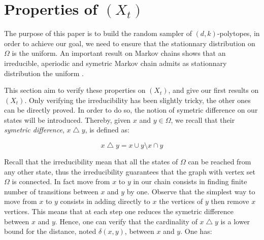 \documentclass[a4paper]{article}
\begin{document}
\section{Properties of $(X_t)$}

The purpose of this paper is to build the random sampler of $(d,k)$-polytopes, in order to achieve our goal, we need to ensure that the stationnary distribution on $\Omega$ is the uniform. An important result on Markov chains shows that an irreducible, aperiodic and symetric Markov chain admits as stationnary distribution the uniform \cite{levin2009markov}.

This section aim to verify these properties on $(X_t)$, and give our first results on $(X_t)$. Only verifying the irreducibility has been slightly tricky, the other ones can be directly proved. In order to do so, the notion of symetric difference on our states will be introduced. Thereby, given $x$ and $y \in \Omega$, we recall that their \textit{symetric difference}, $x \bigtriangleup y$, is defined as:

\begin{equation}
  x \bigtriangleup y = x \cup y \setminus x \cap y
\end{equation}

%

  Recall that the irreducibility mean that all the states of $\Omega$ can be reached from any other state, thus the irreducibility guarantees that the graph with vertex set $\Omega$ is connected. In fact move from $x$ to $y$ in our chain consists in finding finite number of transitions between $x$ and $y$ by one. Observe that the simplest way to move from $x$ to $y$ consists in adding directly to $x$ the vertices of $y$ then remove $x$ vertices. This means that at each step one reduces the symetric difference between $x$ and $y$. Hence, one can verify that the cardinality of $x \bigtriangleup y$ is a lower bound for the distance, noted $\delta(x,y)$, between $x$ and $y$. One has:
\end{document}
